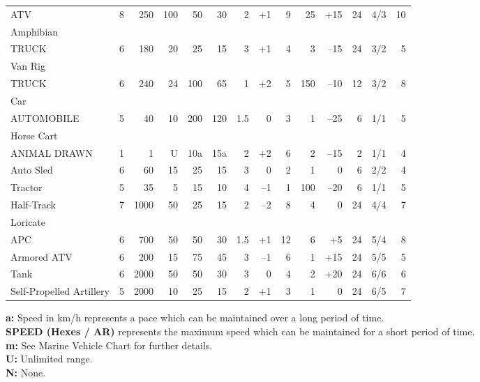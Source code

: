 \begin{table}[htbp]
{\begin{minipage}{0.95\textwidth}
\begin{tabular}{lcrrrrrrrrrrrr}
        \rowcolor{grey}
        {\footnotesize ATV} & 8 & 250 & 100 & 50 & 30 & 2 & +1 & 9 &
        25 & +15 & 24 & 4/3 & 10\\ 
        Amphibian\\
        {\footnotesize TRUCK} & 6 & 180 & 20 & 25 & 15 & 3 & +1 & 4 &
        3 & --15 & 24 & 3/2 & 5\\ 
        \rowcolor{grey}
        Van Rig&&&&&&&&&&&&&\\
        \rowcolor{grey}
        {\footnotesize TRUCK} & 6 & 240 & 24 & 100 & 65 & 1 & +2 & 5 &
        150 & --10 & 12 & 3/2 & 8 \\ 
        Car\\
        {\footnotesize AUTOMOBILE} & 5 & 40 & 10 & 200 & 120 & 1.5 & 0 & 3 &
        1 & --25 & 6 & 1/1 & 5 \\ 
        \rowcolor{grey}
        Horse Cart&&&&&&&&&&&&&\\
        \rowcolor{grey}
        {\footnotesize ANIMAL DRAWN} & 1 & 1 & U & 10a & 15a & 2 & +2 & 6 & 2 & --15 & 2 & 1/1 & 4 \\
        Auto Sled & 6 & 60 & 15 & 25 & 15 & 3 & 0 & 2 & 1 & 0 & 6 & 2/2 & 4\\
        \rowcolor{grey}
        Tractor & 5 & 35 & 5 & 15 & 10 & 4 & --1 & 1 & 100 & --20 & 6 & 1/1 & 5 \\
        Half-Track & 7 & 1000 & 50 & 25 & 15 & 2 & --2 & 8 & 4 & 0 & 24 & 4/4 & 7 \\
        \rowcolor{grey}
        Loricate&&&&&&&&&&&&&\\
        \rowcolor{grey}
        {\footnotesize APC} & 6 & 700 & 50 & 50 & 30 & 1.5 & +1 & 12 & 6 & +5 & 24 & 5/4 & 8\\
        Armored ATV & 6 & 200 & 15 & 75 & 45 & 3 & --1 & 6 & 1 & +15 & 24 & 5/5 & 5 \\
        \rowcolor{grey}
        Tank & 6 & 2000 & 50 & 50 & 30 & 3 & 0 & 4 & 2 & +20 & 24 & 6/6 & 6 \\
        Self-Propelled Artillery & 5 & 2000 & 10 & 25 & 15 & 2 & +1 & 3 & 1 & 0 & 24 & 6/5 & 7 
      \end{tabular}

      \medskip

      \parbox{\textwidth}{\textbf{a:} Speed in km/h represents a pace which
          can be  maintained 
          over a long period of time.\\
        \textbf{SPEED (Hexes / AR)} represents the maximum speed which can
          be maintained for a short period of time.\\
        \textbf{m:} See Marine Vehicle Chart for further details. \\
        \textbf{U:} Unlimited range. \\
        \textbf{N:} None.}
    \end{minipage}}
\end{table}

